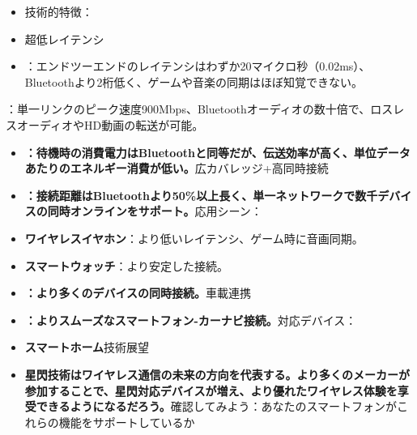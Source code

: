 
\begin{itemize}
  \item 技術的特徴：
  \item 超低レイテンシ
  \item ：エンドツーエンドのレイテンシはわずか20マイクロ秒（0.02ms）、Bluetoothより2桁低く、ゲームや音楽の同期はほぼ知覚できない。
\end{itemize}


：単一リンクのピーク速度900Mbps、Bluetoothオーディオの数十倍で、ロスレスオーディオやHD動画の転送が可能。


\begin{itemize}
  \item \textbf{：待機時の消費電力はBluetoothと同等だが、伝送効率が高く、単位データあたりのエネルギー消費が低い。}広カバレッジ+高同時接続
  \item \textbf{：接続距離はBluetoothより50\%以上長く、単一ネットワークで数千デバイスの同時オンラインをサポート。}応用シーン：
  \item \textbf{ワイヤレスイヤホン}：より低いレイテンシ、ゲーム時に音画同期。
  \item \textbf{スマートウォッチ}：より安定した接続。
\end{itemize}


\begin{itemize}
  \item \textbf{：より多くのデバイスの同時接続。}車載連携
  \item \textbf{：よりスムーズなスマートフォン-カーナビ接続。}対応デバイス：
  \item \textbf{スマートホーム}技術展望
  \item \textbf{星閃技術はワイヤレス通信の未来の方向を代表する。より多くのメーカーが参加することで、星閃対応デバイスが増え、より優れたワイヤレス体験を享受できるようになるだろう。}確認してみよう：あなたのスマートフォンがこれらの機能をサポートしているか
\end{itemize}


